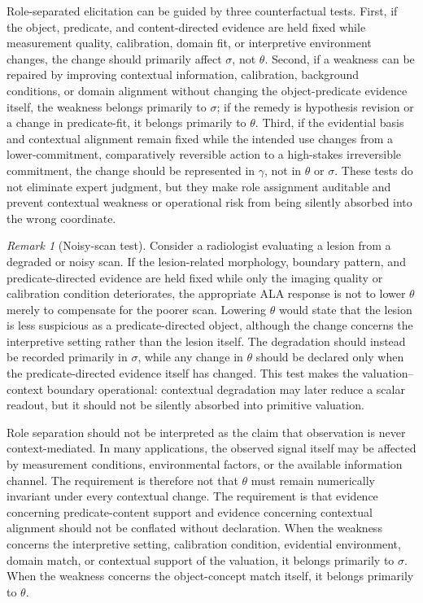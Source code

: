 \documentclass[reqno,final]{amsart}
\theoremstyle{definition}
\theoremstyle{plain}
\theoremstyle{remark}
\newtheorem{remark}{Remark}
\begin{document}
Role-separated elicitation can be guided by three counterfactual tests. First, if the object, predicate, and content-directed evidence are held fixed while measurement quality, calibration, domain fit, or interpretive environment changes, the change should primarily affect \(\sigma\), not \(\theta\). Second, if a weakness can be repaired by improving contextual information, calibration, background conditions, or domain alignment without changing the object-predicate evidence itself, the weakness belongs primarily to \(\sigma\); if the remedy is hypothesis revision or a change in predicate-fit, it belongs primarily to \(\theta\). Third, if the evidential basis and contextual alignment remain fixed while the intended use changes from a lower-commitment, comparatively reversible action to a high-stakes irreversible commitment, the change should be represented in \(\gamma\), not in \(\theta\) or \(\sigma\). These tests do not eliminate expert judgment, but they make role assignment auditable and prevent contextual weakness or operational risk from being silently absorbed into the wrong coordinate.

\begin{remark}[Noisy-scan test]
Consider a radiologist evaluating a lesion from a degraded or noisy scan. If the lesion-related morphology, boundary pattern, and predicate-directed evidence are held fixed while only the imaging quality or calibration condition deteriorates, the appropriate ALA response is not to lower \(\theta\) merely to compensate for the poorer scan. Lowering \(\theta\) would state that the lesion is less suspicious as a predicate-directed object, although the change concerns the interpretive setting rather than the lesion itself. The degradation should instead be recorded primarily in \(\sigma\), while any change in \(\theta\) should be declared only when the predicate-directed evidence itself has changed. This test makes the valuation--context boundary operational: contextual degradation may later reduce a scalar readout, but it should not be silently absorbed into primitive valuation.
\end{remark}

Role separation should not be interpreted as the claim that observation is never context-mediated. In many applications, the observed signal itself may be affected by measurement conditions, environmental factors, or the available information channel. The requirement is therefore not that \(\theta\) must remain numerically invariant under every contextual change. The requirement is that evidence concerning predicate-content support and evidence concerning contextual alignment should not be conflated without declaration. When the weakness concerns the interpretive setting, calibration condition, evidential environment, domain match, or contextual support of the valuation, it belongs primarily to \(\sigma\). When the weakness concerns the object-concept match itself, it belongs primarily to \(\theta\).
\end{document}
